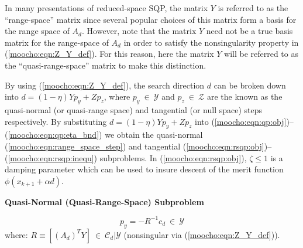\documentclass[pdf,ps2pdf,11pt]{SANDreport}
\begin{document}
{In many presentations of reduced-space SQP, the matrix $Y$ is referred to as the ``range-space''
matrix since several popular choices of this matrix form a basis for the range space
of $A_d$.  However, note that the matrix $Y$ need not be a true basis matrix for the range-space of
$A_d$ in order to satisfy the nonsingularity property in (\ref{moocho:eqn:Z_Y_def}).
For this reason, here the matrix $Y$ will be referred to as the ``quasi-range-space'' matrix to make this
distinction.

By using (\ref{moocho:eqn:Z_Y_def}), the search direction $d$
can be broken down into $d = (1-\eta) Y p_y + Z p_z$, where $p_y \:\in\:\mathcal{Y}$ and $p_z \:\in\:\mathcal{Z}$ are the
known as the quasi-normal (or quasi-range space) and tangential (or null space) steps respectively.
By substituting $d = (1-\eta) Y p_y + Z p_z$ into
(\ref{moocho:eqn:qp:obj})--(\ref{moocho:eqn:qp:eta_bnd}) we obtain the quasi-normal
(\ref{moocho:eqn:range_space_step}) and tangential (\ref{moocho:eqn:rsqp:obj})--(\ref{moocho:eqn:rsqp:inequ})
subproblems.  In (\ref{moocho:eqn:rsqp:obj}), $\zeta \leq 1 $ is a damping parameter which can be used to insure
descent of the merit function $\phi(x_{k+1}+\alpha d)$.\\[1ex]

{\bsinglespace
\begin{center}\textbf{Quasi-Normal (Quasi-Range-Space) Subproblem}\end{center}
\begin{equation}
p_y = - R^{-1} c_d \:\in\:\mathcal{Y}
\label{moocho:eqn:range_space_step}
\end{equation}
\hspace{4ex}where: $R \equiv [(A_d)^T Y]  \:\in\:\mathcal{C}_d|\mathcal{Y}$
	(nonsingular via (\ref{moocho:eqn:Z_Y_def})). \\[2ex]

}}
\end{document}
